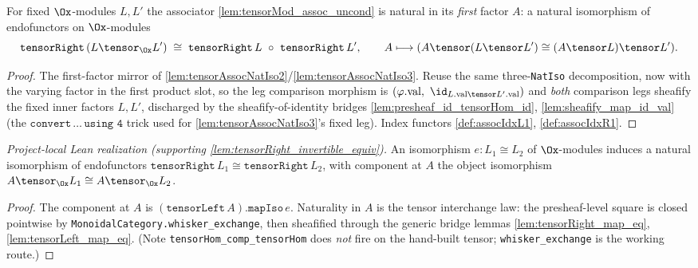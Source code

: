 \begin{lemma}

  \label{lem:tensorAssocNatIso1}
  For fixed $\Ox$-modules $L, L'$ the associator \cref{lem:tensorMod_assoc_uncond} is natural
  in its \emph{first} factor $A$: a natural isomorphism of endofunctors on $\Ox$-modules
  \[
    \texttt{tensorRight}\,(L \tensor_{\Ox} L') \;\cong\;
      \texttt{tensorRight}\,L \ \circ\ \texttt{tensorRight}\,L',
    \qquad A \longmapsto (A \tensor (L \tensor L') \cong (A \tensor L) \tensor L').
  \]
  \begin{proof}
    The first-factor mirror of \cref{lem:tensorAssocNatIso2}/\cref{lem:tensorAssocNatIso3}.
    Reuse the same three-\texttt{NatIso} decomposition, now with the varying factor in the
    first product slot, so the leg comparison morphism is $(\varphi.\mathrm{val},\
    \id_{L.\mathrm{val} \tensor L'.\mathrm{val}})$ and \emph{both} comparison legs sheafify
    the fixed inner factors $L, L'$, discharged by the sheafify-of-identity bridges
    \cref{lem:presheaf_id_tensorHom_id}, \cref{lem:sheafify_map_id_val} (the
    $\texttt{convert}\,\dots\,\texttt{using 4}$ trick used for \cref{lem:tensorAssocNatIso3}'s
    fixed leg). Index functors \cref{def:assocIdxL1}, \cref{def:assocIdxR1}.
  \end{proof}
\end{lemma}

\begin{lemma}

  \label{lem:tensorRightMapIso}
  \textit{Project-local Lean realization (supporting \cref{lem:tensorRight_invertible_equiv}).}
  An isomorphism $e : L_1 \cong L_2$ of $\Ox$-modules induces a natural isomorphism of
  endofunctors $\texttt{tensorRight}\,L_1 \cong \texttt{tensorRight}\,L_2$, with component at $A$
  the object isomorphism $A \tensor_{\Ox} L_1 \cong A \tensor_{\Ox} L_2$.
  \begin{proof}
    The component at $A$ is $(\texttt{tensorLeft}\,A).\texttt{mapIso}\,e$. Naturality in $A$ is
    the tensor interchange law: the presheaf-level square is closed pointwise by
    \texttt{MonoidalCategory.whisker\_exchange}, then sheafified through the generic bridge
    lemmas \cref{lem:tensorRight_map_eq}, \cref{lem:tensorLeft_map_eq}. (Note
    \texttt{tensorHom\_comp\_tensorHom} does \emph{not} fire on the hand-built tensor;
    \texttt{whisker\_exchange} is the working route.)
  \end{proof}
\end{lemma}

